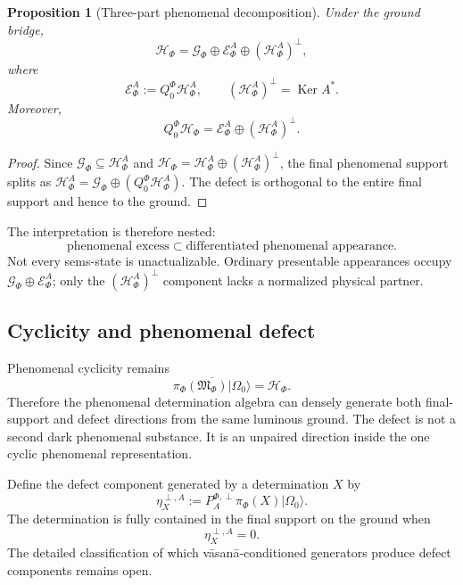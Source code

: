 \documentclass[11pt,reqno]{scrartcl}
\newcommand{\scrHF}{\mathscr H_{\Phi}}
\newcommand{\algF}{\mathfrak M_{\Phi}}
\newcommand{\piF}{\pi_{\Phi}}
\newcommand{\QzeroF}{Q_{0}^{\Phi}}
\newcommand{\GzeroF}{\mathscr G_{\Phi}}
\newcommand{\ket}[1]{\lvert #1\rangle}
\DeclareMathOperator{\Ker}{Ker}
\newcommand{\actHF}{\mathscr H_{\Phi}^{A}}
\newcommand{\defectProjF}{P_{A}^{\Phi,\perp}}
\newcommand{\defectHF}{(\mathscr H_{\Phi}^{A})^{\perp}}
\newcommand{\actAppF}{\mathscr E_{\Phi}^{A}}
\theoremstyle{plain}
\newtheorem{proposition}[proposition]{Proposition}
\theoremstyle{definition}
\theoremstyle{remark}
\begin{document}
\begin{proposition}[Three-part phenomenal decomposition]
\label{prop:three-part-phenomenal-decomposition}
Under the ground bridge,
\begin{equation}
  \boxed{
  \scrHF
  =\GzeroF
  \oplus
  \actAppF
  \oplus
  \defectHF,}
  \label{eq:three-part-phenomenal-decomp}
\end{equation}
where
\begin{equation}
  \actAppF:=\QzeroF\actHF,
  \qquad
  \defectHF=\Ker A^*.
  \label{eq:rep-excess-appearance-spaces}
\end{equation}
Moreover,
\begin{equation}
  \QzeroF\scrHF
  =\actAppF\oplus\defectHF.
  \label{eq:differentiated-split}
\end{equation}
\end{proposition}

\begin{proof}
Since $\GzeroF\subseteq\actHF$ and
$\scrHF=\actHF\oplus\defectHF$, the final phenomenal support splits as
$\actHF=\GzeroF\oplus(\QzeroF\actHF)$.  The defect is orthogonal to the entire
final support and hence to the ground.
\end{proof}

The interpretation is therefore nested:
\begin{equation}
  \boxed{
  \text{phenomenal excess}
  \subset
  \text{differentiated phenomenal appearance}.}
  \label{eq:excess-subset-appearance}
\end{equation}
Not every sems-state is unactualizable.  Ordinary presentable appearances
occupy $\GzeroF\oplus\actAppF$; only the $\defectHF$ component lacks a
normalized physical partner.

\subsection{Cyclicity and phenomenal defect}

Phenomenal cyclicity remains
\begin{equation}
  \overline{\piF(\algF)\ket{\Omega_0}}=\scrHF.
  \label{eq:cyclicity-reaches-excess}
\end{equation}
Therefore the phenomenal determination algebra can densely generate both
final-support and defect directions from the same luminous ground.  The
defect is not a second dark phenomenal substance.  It is an unpaired
direction inside the one cyclic phenomenal representation.

Define the defect component generated by a determination $X$ by
\begin{equation}
  \eta_X^{\perp,A}
  :=\defectProjF\piF(X)\ket{\Omega_0}.
  \label{eq:excess-part-determination}
\end{equation}
The determination is fully contained in the final support on the ground when
\begin{equation}
  \eta_X^{\perp,A}=0.
  \label{eq:determination-fully-representable}
\end{equation}
The detailed classification of which v\=asan\=a-conditioned generators produce
defect components remains open.
\end{document}

